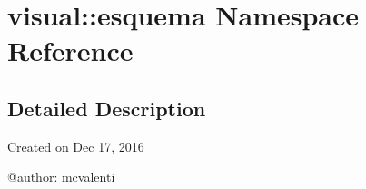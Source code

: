 \section{visual\-:\-:esquema \-Namespace \-Reference}
\label{namespacevisual_1_1esquema}


\subsection{\-Detailed \-Description}
\begin{DoxyVerb}
Created on Dec 17, 2016

@author: mcvalenti
\end{DoxyVerb}
 